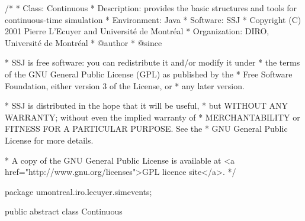 \begin{code}
\begin{hide}
/*
 * Class:        Continuous
 * Description:  provides the basic structures and tools for 
                 continuous-time simulation
 * Environment:  Java
 * Software:     SSJ 
 * Copyright (C) 2001  Pierre L'Ecuyer and Université de Montréal
 * Organization: DIRO, Université de Montréal
 * @author       
 * @since

 * SSJ is free software: you can redistribute it and/or modify it under
 * the terms of the GNU General Public License (GPL) as published by the
 * Free Software Foundation, either version 3 of the License, or
 * any later version.

 * SSJ is distributed in the hope that it will be useful,
 * but WITHOUT ANY WARRANTY; without even the implied warranty of
 * MERCHANTABILITY or FITNESS FOR A PARTICULAR PURPOSE.  See the
 * GNU General Public License for more details.

 * A copy of the GNU General Public License is available at
   <a href="http://www.gnu.org/licenses">GPL licence site</a>.
 */
\end{hide}
package umontreal.iro.lecuyer.simevents;

public abstract class Continuous \begin{hide} {

   // Private variables:

   boolean active; // This variable is currently being integrated.
   double  value;  // Current value of the variable.
   Event  ev;      // Event to be executed after each integ. step,

   //String name;
   double phi;
   double pi;
   double buffer;
   double sum;

   private Simulator sim;
  
\end{hide}
\end{code}

